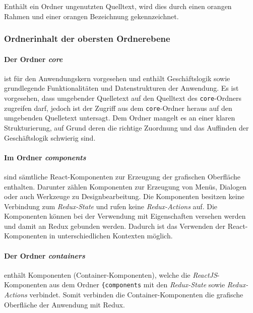 Enthält ein Ordner ungenutzten Quelltext, wird dies durch einen orangen Rahmen und einer orangen Bezeichnung gekennzeichnet.

\subsubsection{Ordnerinhalt der obersten Ordnerebene}
\paragraph{Der Ordner \emph{core}} ist für den Anwendungskern vorgesehen und enthält Geschäftslogik sowie grundlegende Funktionalitäten und Datenstrukturen der Anwendung. 
Es ist vorgesehen, dass umgebender Quelletext auf den Quelltext des \lstinline|core|-Ordners zugreifen darf, jedoch ist der Zugriff aus dem \lstinline|core|-Ordner heraus auf den umgebenden Quelletext untersagt. Dem Ordner mangelt es an einer klaren Strukturierung, auf Grund deren die richtige Zuordnung und das Auffinden der Geschäftslogik schwierig sind. 

\paragraph{Im Ordner \emph{components}} sind sämtliche React-Komponenten zur Erzeugung der grafischen Oberfläche enthalten. Darunter zählen Komponenten zur Erzeugung von Menüs, Dialogen oder auch Werkzeuge zu Designbearbeitung. Die Komponenten besitzen keine Verbindung zum \emph{Redux-State} und rufen keine \emph{Redux-Actions} auf. Die Komponenten können bei der Verwendung mit Eigenschaften versehen werden und damit an Redux gebunden werden. Dadurch ist das Verwenden der React-Komponenten in unterschiedlichen Kontexten möglich.

\paragraph{Der Ordner \emph{containers}} enthält Komponenten (Container-Komponenten), welche die \emph{ReactJS}-Komponenten aus dem Ordner \lstinline|{components| mit den \emph{Redux-State} sowie \emph{Redux-Actions} verbindet. Somit verbinden die Container-Komponenten die grafische Oberfläche der Anwendung mit Redux.



